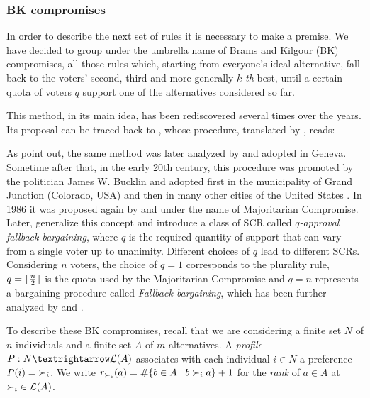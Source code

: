 \subsubsection{BK compromises}
\label{sec:BK}
In order to describe the next set of rules it is necessary to make a premise. We have decided to group under the umbrella name of Brams and Kilgour (BK) compromises, all those rules which, starting from everyone’s ideal alternative, fall back to the voters’ second, third and more generally $k$-\emph{th} best, until a certain quota of voters $q$ support one of the alternatives considered so far.

This method, in its main idea, has been rediscovered several times over the years. Its proposal can be traced back to \citet{Condorcet1789, Condorcet1793}, whose procedure, translated by \citet[pp. 249-250]{McLean1994}, reads:  

As \cite{Camps2014} point out, the same method was later analyzed by \cite{Lhuilier1793} and adopted in Geneva. Sometime after that, in the early 20th century, this procedure was promoted by the politician James W. Bucklin and adopted first in the municipality of Grand Junction (Colorado, USA) and then in many other cities of the United States \cite[p. 167]{Barber2000}. In 1986 it was proposed again by \citet{Sertel1986} and \citet{Sertel1999} under the name of Majoritarian Compromise. Later, \citet{Brams2001} generalize this concept and introduce a class of \acs{SCR} called $q$\emph{-approval fallback bargaining}, where $q$ is the required quantity of support that can vary from a single voter up to unanimity. Different choices of $q$ lead to different \acp{SCR}. Considering $n$ voters, the choice of $q=1$ corresponds to the plurality rule, $q=\lceil\frac{n}{2}\rceil$ is the quota used by the Majoritarian Compromise and $q=n$ represents a bargaining procedure called \emph{Fallback bargaining}, which has been further analyzed by \citet{Kibris2007} and \citet{Congar2012}.

To describe these BK compromises, recall that we are considering a finite set $N$ of $n$ individuals and a finite set $A$ of $m$ alternatives. A \emph{profile} $P: N → \linors$ associates with each individual $i \in N$ a preference $P(i) = {\prefi}$.
We write $r_{\prefi}(a)=\#\{b\in A \suchthat b \prefi a\}+1$ for the \emph{rank} of $a\in A$ at ${\prefi} \in \linors$.


